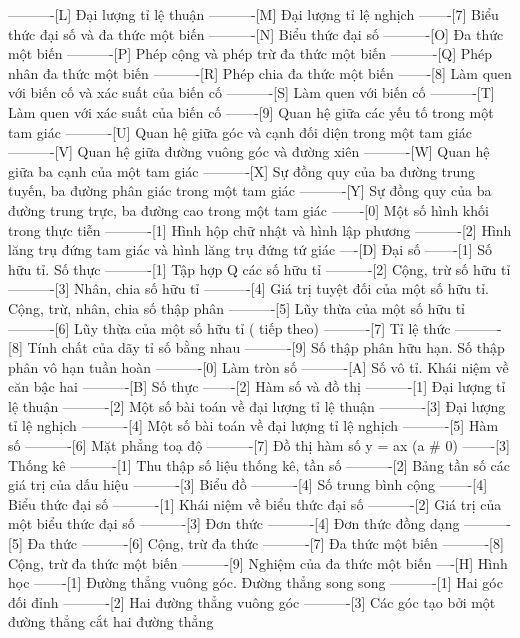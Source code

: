 ----------[L] Đại lượng tỉ lệ thuận
----------[M] Đại lượng tỉ lệ nghịch
-------[7] Biểu thức đại số và đa thức một biến
----------[N] Biểu thức đại số
----------[O] Đa thức một biến
----------[P] Phép cộng và phép trừ đa thức một biến
----------[Q] Phép nhân đa thức một biến
----------[R] Phép chia đa thức một biến
-------[8] Làm quen với biến cố và xác suất của biến cố
----------[S] Làm quen với biến cố
----------[T] Làm quen với xác suất của biến cố
-------[9] Quan hệ giữa các yếu tố trong một tam giác
----------[U] Quan hệ giữa góc và cạnh đối diện trong một tam giác
----------[V] Quan hệ giữa đường vuông góc và đường xiên
----------[W] Quan hệ giữa ba cạnh của một tam giác
----------[X] Sự đồng quy của ba đường trung tuyến, ba đường phân giác trong một tam giác
----------[Y] Sự đồng quy của ba đường trung trực, ba đường cao trong một tam giác
-------[0] Một số hình khối trong thực tiễn
----------[1] Hình hộp chữ nhật và hình lập phương
----------[2] Hình lăng trụ đứng tam giác và hình lăng trụ đứng tứ giác
----[D] Đại số
-------[1] Số hữu tỉ. Số thực
----------[1] Tập hợp Q các số hữu tỉ
----------[2] Cộng, trừ số hữu tỉ
----------[3] Nhân, chia số hữu tỉ
----------[4] Giá trị tuyệt đối của một số hữu tỉ. Cộng, trừ, nhân, chia số thập phân
----------[5] Lũy thừa của một số hữu tỉ
----------[6] Lũy thừa của một số hữu tỉ ( tiếp theo)
----------[7] Tỉ lệ thức
----------[8] Tính chất của dãy tỉ số bằng nhau
----------[9] Số thập phân hữu hạn. Số thập phân vô hạn tuần hoàn
----------[0] Làm tròn số
----------[A] Số vô tỉ. Khái niệm về căn bậc hai
----------[B] Số thực
-------[2] Hàm số và đồ thị
----------[1] Đại lượng tỉ lệ thuận
----------[2] Một số bài toán về đại lượng tỉ lệ thuận
----------[3] Đại lượng tỉ lệ nghịch
----------[4] Một số bài toán về đại lượng tỉ lệ nghịch
----------[5] Hàm số
----------[6] Mặt phẳng toạ độ
----------[7] Đồ thị hàm số y = ax (a # 0)
-------[3] Thống kê
----------[1] Thu thập số liệu thống kê, tần số
----------[2] Bảng tần số các giá trị của dấu hiệu
----------[3] Biểu đồ
----------[4] Số trung bình cộng
-------[4] Biểu thức đại số
----------[1] Khái niệm về biểu thức đại số
----------[2] Giá trị của một biểu thức đại số
----------[3] Đơn thức
----------[4] Đơn thức đồng dạng
----------[5] Đa thức
----------[6] Cộng, trừ đa thức
----------[7] Đa thức một biến
----------[8] Cộng, trừ đa thức một biến
----------[9] Nghiệm của đa thức một biến
----[H] Hình học
-------[1] Đường thẳng vuông góc. Đường thẳng song song
----------[1] Hai góc đối đỉnh
----------[2] Hai đường thẳng vuông góc
----------[3] Các góc tạo bởi một đường thẳng cắt hai đường thẳng
